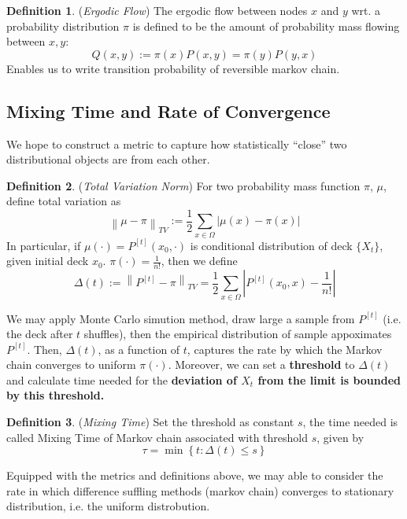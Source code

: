 \documentclass[a4paper, 11pt]{article}
\theoremstyle{definition}
\newtheorem{definition}{Definition}
\begin{document}
\begin{definition} (\textit{Ergodic Flow}) The ergodic flow between nodes $x$ and $y$ wrt. a probability distribution $\pi$ is defined
to be the amount of probability mass flowing between $x,y$:
$$Q(x,y):=\pi(x)P(x,y)=\pi(y)P(y,x)$$
Enables us to write transition probability of reversible markov chain.
\end{definition}

\subsection{Mixing Time and Rate of Convergence}
We hope to construct a metric to capture how statistically ``close'' two distributional objects are from each other.
\begin{definition}(\textit{Total Variation Norm})
For two probability mass function $\pi$, $\mu$, define total variation as
$$\left\|\mu - \pi\right\|_{TV}:=\frac{1}{2}\sum_{x\in \Omega}|\mu(x)-\pi(x)|$$
In particular, if $\mu(\cdot)=P^{[t]}(x_0,\cdot)$ is conditional distribution of deck $\{X_t\}$, given initial deck $x_0$. $\pi(\cdot)=\frac{1}{n!}$, then we define
$$\Delta(t):=\left\|P^{[t]}-\pi\right\|_{TV}=\frac{1}{2}\sum_{x\in \Omega}\left|P^{[t]}(x_0, x)-\frac{1}{n!}\right|$$
\end{definition}

We may apply Monte Carlo simution method, draw large a sample from $P^{[t]}$ (i.e. the deck after $t$ shuffles), then the empirical distribution of sample appoximates $P^{[t]}$. Then, $\Delta(t)$, as a function of $t$, captures the rate by which the Markov chain converges to uniform $\pi(\cdot)$. Moreover, we can set a \textbf{threshold} to $\Delta(t)$ and calculate time needed for the \textbf{deviation of $X_t$ from the limit is bounded by this threshold.}

\begin{definition}(\textit{Mixing Time})
Set the threshold as constant $s$, the time needed is called Mixing Time of Markov chain associated with threshold $s$, given by
$$\tau = \min\left\{t: \Delta(t)\leq s\right\}$$
\end{definition}

Equipped with the metrics and definitions above, we may able to consider the rate in which difference suffling methods (markov chain) converges to stationary distribution, i.e. the uniform distrobution. 




\end{document}
